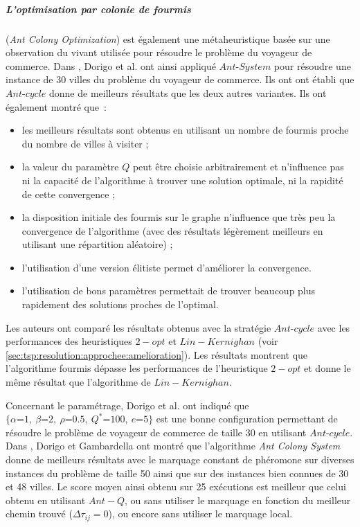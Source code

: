 \subparagraph{L'optimisation par colonie de fourmis} (\textit{Ant Colony Optimization}) est également une métaheuristique basée sur une observation du vivant utilisée pour résoudre le problème du voyageur de commerce.
Dans \cite{Dorigo1991}, Dorigo et al. ont ainsi appliqué $Ant$-$System$ pour résoudre une instance de 30 villes du problème du voyageur de commerce. Ils ont ont établi que $Ant$-$cycle$ donne de meilleurs résultats que les deux autres variantes. Ils ont également montré que~:
\begin{itemize}
 \item les meilleurs résultats sont obtenus en utilisant un nombre de fourmis proche du nombre de villes à visiter ;
 \item la valeur du paramètre $Q$ peut être choisie arbitrairement et n'influence pas ni la capacité de l'algorithme à trouver une solution optimale, ni la rapidité de cette convergence ; 
 \item la disposition initiale des fourmis sur le graphe n'influence que très peu la convergence de l'algorithme (avec des résultats légèrement meilleurs en utilisant une répartition aléatoire) ;
 \item l'utilisation d'une version élitiste permet d'améliorer la convergence.
 \item l'utilisation de bons paramètres permettait de trouver beaucoup plus rapidement des solutions proches de l'optimal.
\end{itemize}

Les auteurs ont comparé les résultats obtenus avec la stratégie $Ant$-$cycle$ avec les performances des heuristiques $2-opt$ et $Lin-Kernighan$ (voir \ref{sec:tsp:resolution:approchee:amelioration}). Les résultats montrent que l'algorithme fourmis dépasse les performances de l'heuristique $2-opt$ et donne le même résultat que l'algorithme de $Lin-Kernighan$.

Concernant le paramétrage, Dorigo et al. ont indiqué que $\{{\alpha\text{=}1,~} {\beta\text{=}2,~} {\rho\text{=}0.5,~} {Q^*\text{=}100,~} {e\text{=}5}\}$ est une bonne configuration permettant de résoudre le problème de voyageur de commerce de taille 30 en utilisant $Ant$-$cycle$.\\

 Dans \cite{Dorigo1997}, Dorigo et Gambardella ont montré que l'algorithme \textit{Ant Colony System} donne de meilleurs résultats avec le marquage constant de phéromone sur diverses instances du problème de taille 50 ainsi que sur des instances bien connues de 30 et 48 villes. Le score moyen ainsi obtenu sur 25 exécutions est meilleur que celui obtenu en utilisant $Ant-Q$, ou sans utiliser le marquage en fonction du meilleur chemin trouvé ($\Delta\tau_{ij}=0$), ou encore sans utiliser le marquage local.
 
